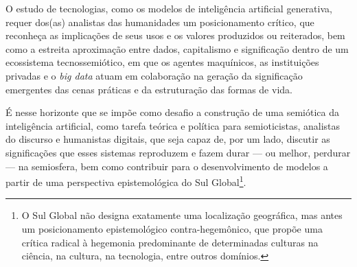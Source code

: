 \documentclass[portuguese]{textolivre}
\begin{document}
O estudo de tecnologias, como os modelos de inteligência artificial generativa, requer dos(as) analistas das humanidades um posicionamento crítico, que reconheça as implicações de seus usos e os valores produzidos ou reiterados, bem como a estreita aproximação entre dados, capitalismo e significação dentro de um ecossistema tecnossemiótico, em que os agentes maquínicos, as instituições privadas e o \textit{big data} atuam em colaboração na geração da significação emergentes das cenas práticas e da estruturação das formas de vida.

É nesse horizonte que se impõe como desafio a construção de uma semiótica da inteligência artificial, como tarefa teórica e política para semioticistas, analistas do discurso e humanistas digitais, que seja capaz de, por um lado, discutir as significações que esses sistemas reproduzem e fazem durar — ou melhor, perdurar — na semiosfera, bem como contribuir para o desenvolvimento de modelos a partir de uma perspectiva epistemológica do Sul Global\footnote{O Sul Global não designa exatamente uma localização geográfica, mas antes um posicionamento epistemológico contra-hegemônico, que propõe uma crítica radical à hegemonia predominante de determinadas culturas na ciência, na cultura, na tecnologia, entre outros domínios.}.

\printbibliography\label{sec-bib}


\begin{dataavailability}
\end{dataavailability}
\end{document}
